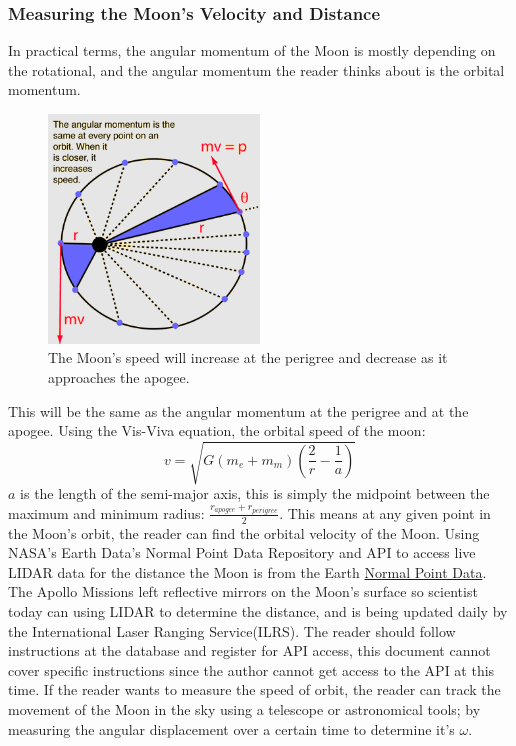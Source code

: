 \documentclass[12pt,oneside,a4paper,english]{article}
\begin{document}
\subsubsection{Measuring the Moon's Velocity and Distance}
In practical terms, the angular momentum of the Moon is mostly depending on the rotational, and the angular momentum the reader thinks about is the orbital momentum.
\begin{figure}[H]
    \centering
    \includegraphics[width=0.5\textwidth]{VelocityVal.png}
    \caption{The Moon's speed will increase at the perigree and decrease as it approaches the apogee.}
\end{figure}
This will be the same as the angular momentum at the perigree and at the apogee. Using the Vis-Viva equation, the orbital speed of the moon:
\begin{equation}
    v = \sqrt{G(m_e+m_m)(\frac{2}{r}-\frac{1}{a})}
\end{equation}
$a$ is the length of the semi-major axis, this is simply the midpoint between the maximum and minimum radius: $\frac{r_{apogee}+r_{perigree}}{2}$. This means at any given point in the Moon's orbit, the reader can find the orbital velocity of the Moon. Using NASA's Earth Data's Normal Point Data Repository and API to access live LIDAR data for the distance the Moon is from the Earth \href{https://cddis.nasa.gov/Data_and_Derived_Products/SLR/Normal_point_data.html}{Normal Point Data}. The Apollo Missions left reflective mirrors on the Moon's surface so scientist today can using LIDAR to determine the distance, and is being updated daily by the International Laser Ranging Service(ILRS)\cite{LLR}. The reader should follow instructions at the database and register for API access, this document cannot cover specific instructions since the author cannot get access to the API at this time. If the reader wants to measure the speed of orbit, the reader can track the movement of the Moon in the sky using a telescope or astronomical tools; by measuring the angular displacement over a certain time to determine it's $\omega$.
\end{document}
